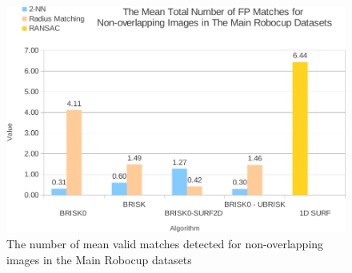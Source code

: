 \documentclass{report}
\begin{document}
% 
%


\begin{figure}
  \centering
    \includegraphics[width=1.0\textwidth]{../Drawings/Graphs/mrb_nvm_nol.pdf}
    \caption{The number of mean valid matches detected for non-overlapping images in the Main Robocup datasets} 
    \label{fig:mrd_nvm_nol}
\end{figure}
\end{document}
